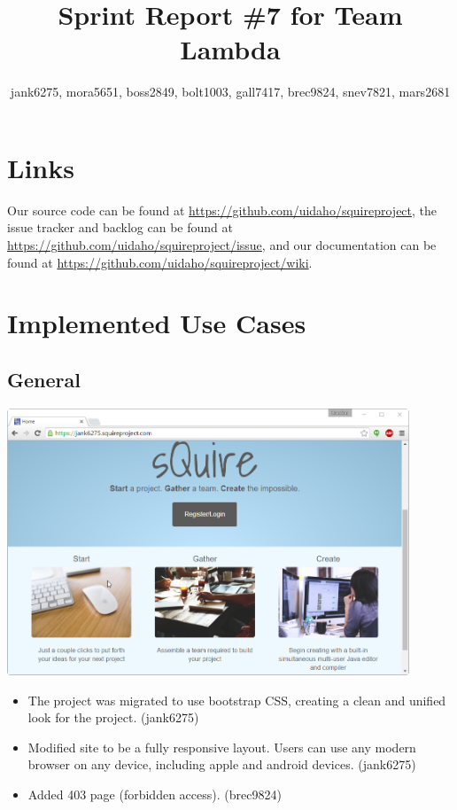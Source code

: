 \documentclass[11pt]{report}
\title{Sprint Report \#7 for Team Lambda}
\author{jank6275, mora5651, boss2849, bolt1003, gall7417, brec9824, snev7821, mars2681}
\begin{document}
\maketitle

\tableofcontents
\chapter{Links}
    Our source code can be found at \url{https://github.com/uidaho/squireproject}, the issue tracker and backlog can be found at \url{https://github.com/uidaho/squireproject/issue}, and our documentation can be found at \url{https://github.com/uidaho/squireproject/wiki}.

\chapter{Implemented Use Cases}
\section{General}
    \includegraphics[width=0.9\textwidth]{images/index}
    \begin{itemize}
        \item The project was migrated to use bootstrap CSS, creating a clean and unified look for the project. (jank6275)
        \item Modified site to be a fully responsive layout. Users can use any modern browser on any device, including apple and android devices. (jank6275)
        \item Added 403 page (forbidden access). (brec9824)
    \end{itemize}
    
\end{document}
